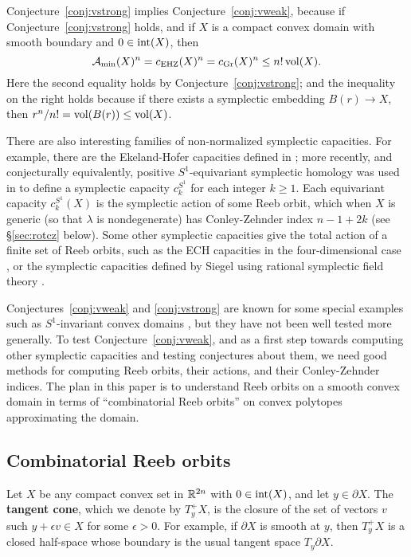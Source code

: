 Conjecture~\ref{conj:vstrong} implies Conjecture~\ref{conj:vweak}, because if Conjecture~\ref{conj:vstrong} holds, and if $X$ is a compact convex domain with smooth boundary and $0\in\operatorname{int}(X)$, then
\[
{\mathcal A}_{\operatorname{min}}(X)^n = c_{\operatorname{EHZ}}(X)^n = c_{\operatorname{Gr}}(X)^n \le n!\operatorname{vol}(X).
\]
Here the second equality holds by Conjecture~\ref{conj:vstrong}; and the inequality on the right holds because if there exists a symplectic embedding $B(r)\to X$, then $r^n/n! = \operatorname{vol}(B(r)) \le \operatorname{vol}(X)$.

There are also interesting families of non-normalized symplectic capacities.
For example, there are the Ekeland-Hofer capacities defined in \cite{eh}; more recently, and conjecturally equivalently, positive $S^1$-equivariant symplectic homology was used in \cite{gh} to define a symplectic capacity $c_k^{S^1}$ for each integer $k\ge 1$. Each equivariant capacity $c_k^{S^1}(X)$ is the symplectic action of some Reeb orbit, which when $X$ is generic (so that $\lambda$ is nondegenerate) has Conley-Zehnder index $n-1+2k$ (see \S\ref{sec:rotcz} below). Some other symplectic capacities give the total action of a finite set of Reeb orbits, such as the ECH capacities in the four-dimensional case \cite{qech}, or the symplectic capacities defined by Siegel using rational symplectic field theory \cite{siegel}.

Conjectures~\ref{conj:vweak} and \ref{conj:vstrong} are known for some special examples such as $S^1$-invariant convex domains \cite{ghr}, but they have not been well tested more generally. To test Conjecture~\ref{conj:vweak}, and as a first step towards computing other symplectic capacities and testing conjectures about them, we need good methods for computing Reeb orbits, their actions, and their Conley-Zehnder indices. The plan in this paper is to understand Reeb orbits on a smooth convex domain in terms of ``combinatorial Reeb orbits'' on convex polytopes approximating the domain.

\subsection{Combinatorial Reeb orbits}
\label{sec:cro}

Let $X$ be any compact convex set in ${\mathbb R}^{2n}$ with $0\in\operatorname{int}(X)$, and let $y\in\partial X$. The {\bf tangent cone\/}, which we denote by $T_y^+X$, is the closure of the set of vectors $v$ such $y+\epsilon v\in X$ for some $\epsilon>0$. For example, if $\partial X$ is smooth at $y$, then $T_y^+X$ is a closed half-space whose boundary is the usual tangent space $T_y\partial X$.

